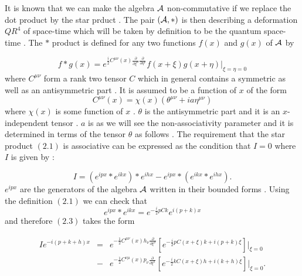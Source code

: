 \documentclass[a4paper,12pt]{article}
\begin{document}
It is known that we can make the algebra ${\cal A}$
non-commutative if we replace the dot product
 by the star prduct \cite{kon} . The pair $({\cal A}, *)$ is then describing a deformation $QR^4$ of space-time which
  will be
 taken
 by definition to be the quantum space-time . The $*$ product is defined for any two functions $f(x)$ and $g(x)$
 of ${\cal A}$ by \cite{witten}

\begin{equation}
f*g(x)=e^{\frac{i}{2}{C}^{{\mu}{\nu}}(x)\frac{\partial}{\partial{\xi}^{\mu}}\frac{\partial}{\partial{\eta}^{\nu}}}f(x+{\xi})g(x+{\eta})|_{{\xi}={\eta}=0}
\end{equation}
where ${C}^{{\mu}{\nu}}$ form a rank two tensor ${C}$ which in
general contains a symmetric as well as an antisymmetric
part\cite{peter} . It is assumed to be a function of $x$ of the
form
\begin{equation}
C^{{\mu}{\nu}}(x)={\chi}(x)({\theta}^{{\mu}{\nu}} +
 i a {\eta}^{{\mu}{\nu}})
\end{equation}
where ${\chi}(x)$ is some function of $x$ . ${\theta}$ is the
antisymmetric part and it is an $x$-independent tensor . $a$ is
as we will see the non-associativity parameter and it is
determined in terms of the tensor $\theta$ as follows . The
requirement that the star product $(2.1)$ is associative can be
expressed as the condition that $I=0$ where $I$ is given by :

\begin{equation}
I=(e^{ipx}*e^{ikx})*e^{ihx}-e^{ipx}*(e^{ikx}*e^{ihx}).
\end{equation}
$e^{ipx}$ are the generators of the algebra ${\cal A}$ written in
their bounded forms . Using the definition $(2.1)$ we can check
that
\begin{equation}
e^{ipx}*e^{ikx} =e^{-\frac{i}{2}pCk}e^{i(p+k)x}
\end{equation}
and therefore $(2.3)$ takes the form

\begin{eqnarray}
Ie^{-i(p+k+h)x}&=&e^{-\frac{1}{2}C^{{\mu}{\nu}}(x)h_{\nu}\frac{\partial}{\partial{{\xi}^{\mu}}}}[e^{-\frac{i}{2}pC(x+{\xi})k
+ i(p+k){\xi}}]|_{{\xi}=0}\nonumber\\
&-&e^{-\frac{1}{2}C^{{\nu}{\mu}}(x)p_{\nu}\frac{\partial}{\partial{{\xi}^{\mu}}}}[e^{-\frac{i}{2}kC(x+{\xi})h
+ i(k+h){\xi}}]|_{{\xi}=0}.
\end{eqnarray}
\end{document}
